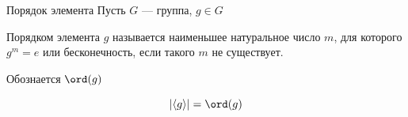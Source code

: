 \begin{defn}{Порядок элемента}{}
    Пусть \( G \) --- группа, \( g \in G \)

    Порядком элемента \( g \) называется наименьшее натуральное число \( m \),
    для которого \( g^m = e \) или бесконечность, если такого \( m \) не существует.

    Обознается \( \ord (g) \)
\end{defn}

\begin{prop}{}{}
    \[
        | \langle g \rangle | = \ord (g)
    \]
\end{prop}
